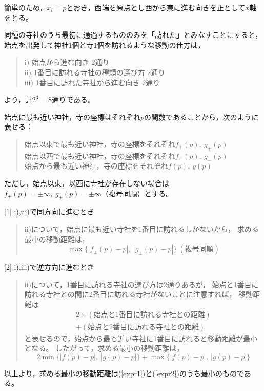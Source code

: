 \documentclass{article}
\begin{document}
簡単のため，$x_i = p$とおき，西端を原点とし西から東に進む向きを正として$x$軸をとる。

同種の寺社のうち最初に通過するもののみを「訪れた」とみなすことにすると，
始点を出発して神社1個と寺1個を訪れるような移動の仕方は，
\begin{quote}
    i) 始点から進む向き 2通り \\
    ii) 1番目に訪れる寺社の種類の選び方 2通り \\
    iii) 1番目に訪れた寺社から進む向き 2通り
\end{quote}
より，計$2^3 = 8$通りである。

始点に最も近い神社，寺の座標はそれぞれ$p$の関数であることから，次のように表せる：
\begin{quote}
    始点以東で最も近い神社，寺の座標をそれぞれ$f_+(p),\ g_+(p)$ \\
    始点以西で最も近い神社，寺の座標をそれぞれ$f_-(p),\ g_-(p)$ \\
    始点から最も近い神社，寺の座標をそれぞれ$f(p),\ g(p)$
\end{quote}

ただし，始点以東，以西に寺社が存在しない場合は$f_\pm(p) = \pm\infty,\ g_\pm(p) = \pm\infty$（複号同順）とする。

[1] i),iii)で同方向に進むとき
\begin{quote}
    ii)について，始点に最も近い寺社を1番目に訪れるしかないから，
    求める最小の移動距離は，
    \begin{equation}
        \label{expr1}
        \max\{ |f_\pm(p) - p|,\ |g_\pm(p) - p| \} \ (\mbox{複号同順})
    \end{equation}
\end{quote}

[2] i),iii)で逆方向に進むとき
\begin{quote}
ii)について，1番目に訪れる寺社の選び方は2通りあるが，
始点と1番目に訪れる寺社との間に2番目に訪れる寺社がないことに注意すれば，
移動距離は
\begin{eqnarray*}
    2 \times (\mbox{始点と1番目に訪れる寺社との距離}) \\
           + (\mbox{始点と2番目に訪れる寺社との距離})
\end{eqnarray*}
と表せるので，始点から最も近い寺社に1番目に訪れると移動距離が最小となる。
したがって，求める最小の移動距離は，
\begin{equation}
    \label{expr2}
    2 \min\{ |f(p) - p|,\ |g(p) - p| \} + \max\{ |f(p) - p|,\ |g(p) - p| \}
\end{equation}
\end{quote}

以上より，求める最小の移動距離は(\ref{expr1})と(\ref{expr2})のうち最小のものである。
\end{document}
